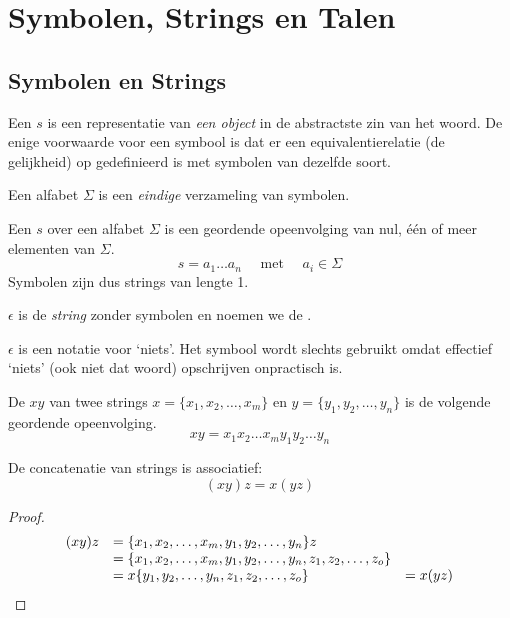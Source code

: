 \documentclass[main.tex]{subfiles}
\begin{document}
\chapter{Symbolen, Strings en Talen}
\label{cha:symbolen-strings-talen}

\section{Symbolen en Strings}
\label{sec:symbolen-en-strings}

\begin{de}
  Een  $s$ is een representatie van \textit{een object} in de abstractste zin van het woord.
  De enige voorwaarde voor een symbool is dat er een equivalentierelatie (de gelijkheid) op gedefinieerd is met symbolen van dezelfde soort.
\end{de}

\begin{de}
  Een alfabet $\Sigma$ is een \textit{eindige} verzameling van symbolen.
\end{de}

\begin{de}
  Een  $s$ over een alfabet $\Sigma$ is een geordende opeenvolging van nul, \'e\'en of meer elementen van $\Sigma$.
  \[ s = a_{1}\ldots a_{n} \quad\text{ met }\quad a_{i} \in \Sigma \]
  Symbolen zijn dus strings van lengte 1.
\end{de}

\begin{de}
  $\epsilon$ is de \textit{string} zonder symbolen en noemen we de .
\end{de}

\begin{opm}
  $\epsilon$ is een notatie voor `niets'. Het symbool wordt slechts gebruikt omdat effectief `niets' (ook niet dat woord) opschrijven onpractisch is.
\end{opm}

\begin{de}
  De  $xy$ van twee strings $x = \{x_1,x_2,\ldots,x_m\}$ en $y =   \{y_1,y_2,\ldots,y_n\}$ is de volgende geordende opeenvolging.
  \[
  xy = x_1x_2\ldots x_my_1y_2\ldots y_n
  \] 
\end{de}

\begin{ei}
  De concatenatie van strings is associatief:
  \[
  (xy)z = x(yz)
  \]

  \begin{proof}
    \[
    \begin{array}{r l l}
      (xy)z &= \{x_1,x_2,\ldots,x_m,y_1,y_2,\ldots,y_n\}z &\\
            &= \{x_1,x_2,\ldots,x_m,y_1,y_2,\ldots,y_n,z_1,z_2,\ldots,z_o\} &\\
            &= x\{y_1,y_2,\ldots,y_n,z_1,z_2,\ldots,z_o\} &= x(yz)
    \end{array}
    \]
  \end{proof}
\end{ei}
\end{document}
